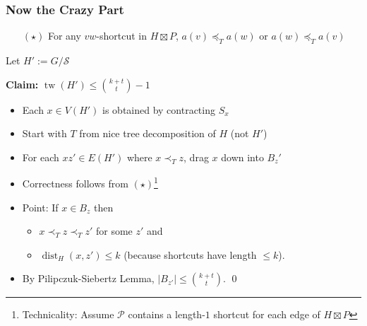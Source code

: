 \documentclass[xcolor=dvipsnames]{beamer}
\DeclareMathOperator{\tw}{tw}
\begin{document}
\begin{frame}
  \frametitle{Now the Crazy Part}

  \begin{itemize}
      \item[$(\star)$] For any $vw$-shortcut in $H\boxtimes P$, $a(v)\preceq_T a(w)$ or $a(w)\preceq_T a(v)$
  \end{itemize}

    \vspace{.5cm}
    Let $H':=G/\mathcal{S}$
    \vspace{.5cm}

    \textbf{Claim:} $\tw(H')\le\binom{k+t}{t}-1$\\
    \vspace{.5cm}
    \begin{itemize}
      \item<2-> Each $x\in V(H')$ is obtained by contracting $S_x$
      \item<3-> Start with $T$ from nice tree decomposition of $H$ (not $H'$)
      \item<4-> For each $xz'\in E(H')$ where $x\prec_T z$, drag $x$ down into $B_z'$
      \item<5-> Correctness follows from $(\star)$\footnote{Technicality: Assume $\mathcal{P}$ contains a length-$1$ shortcut for each edge of $H\boxtimes P$}
      \item<6-> Point: If $x\in B_{z}$ then
      \begin{itemize}
          \item $x\prec_T z\prec_T z'$ for some $z'$ and
          \item $\mathop{dist}_{H}(x,z')\le k$ (because shortcuts have length $\le\!\!k$).
      \end{itemize}
      \item<7-> By Pilipczuk-Siebertz Lemma, $|B_{z'}|\le \binom{k+t}{t}$.
      \hfill{\qed}
    \end{itemize}
\end{frame}
\end{document}
